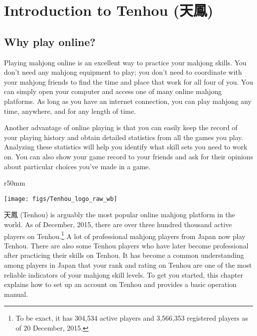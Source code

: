 
\chapter{Introduction to {\jap Tenhou} (天鳳)} \label{ch:Tenhou}
\thispagestyle{empty}

\section{Why play online?}

Playing mahjong online is an excellent way to practice your mahjong skills. You don't need any mahjong equipment to play; you don't need to coordinate with your mahjong friends to find the time and place that work for all four of you. You can simply open your computer and access one of many online mahjong platforms. As long as you have an internet connection, you can play mahjong any time, anywhere, and for any length of time. 

\bigskip
Another advantage of online playing is that you can easily keep the record of your playing history and obtain detailed statistics from all the games you play. Analyzing these statistics will help you identify what skill sets you need to work on. You can also show your game record to your friends and ask for their opinions about particular choices you've made in a game. 

\begin{wrapfigure}{r}{50mm}
\vspace{-20pt}
\begin{center}
\texttt{[image: figs/Tenhou\_logo\_raw\_wb]}
\end{center}
\vspace{-20pt}
\end{wrapfigure}

\bigskip

天鳳 ({\jap Tenhou}) is arguably the most popular online mahjong platform in the world. As of December, 2015, there are over three hundred thousand active players on {\jap Tenhou}.\footnote{To be exact, it has 304,534 active players and 3,566,353 registered players as of 20 December, 2015.} A lot of professional mahjong players from Japan now play {\jap Tenhou}. There are also some {\jap Tenhou} players who have later become professional after practicing their skills on {\jap Tenhou}. It has become a common understanding among players in Japan that your rank and rating on {\jap Tenhou} are one of the most reliable indicators of your mahjong skill levels. 
To get you started, this chapter explains how to set up an account on {\jap Tenhou} and provides a basic operation manual.


